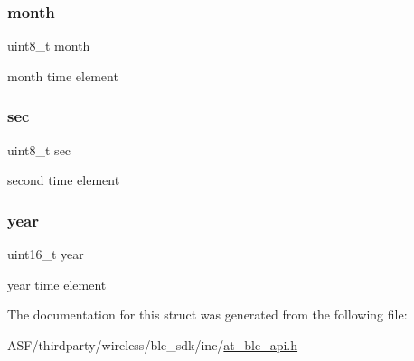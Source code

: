 \subsubsection{\texorpdfstring{month}{month}}
{\footnotesize\ttfamily uint8\+\_\+t month}



month time element 

\mbox{\label{structat__ble__prf__date__time__t_ad1696900026b287a87c563b733a21bc3}} 
\subsubsection{\texorpdfstring{sec}{sec}}
{\footnotesize\ttfamily uint8\+\_\+t sec}



second time element 

\mbox{\label{structat__ble__prf__date__time__t_a57ca98d8f6d4baf0fe41c583c7dcb0d5}} 
\subsubsection{\texorpdfstring{year}{year}}
{\footnotesize\ttfamily uint16\+\_\+t year}



year time element 



The documentation for this struct was generated from the following file\+:\begin{DoxyCompactItemize}
\item 
A\+S\+F/thirdparty/wireless/ble\+\_\+sdk/inc/\mbox{\hyperlink{at__ble__api_8h}{at\+\_\+ble\+\_\+api.\+h}}\end{DoxyCompactItemize}
